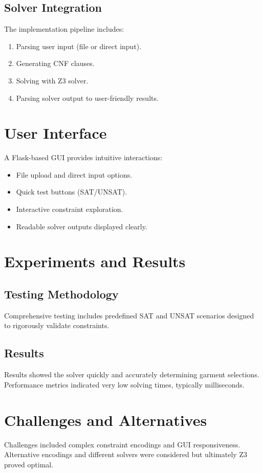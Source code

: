 \documentclass[unicode,11pt,a4paper,oneside,numbers=endperiod,openany]{scrartcl}
\begin{document}
\subsection{Solver Integration}
The implementation pipeline includes:
\begin{enumerate}
    \item Parsing user input (file or direct input).
    \item Generating CNF clauses.
    \item Solving with Z3 solver.
    \item Parsing solver output to user-friendly results.
\end{enumerate}

\section{User Interface}
A Flask-based GUI provides intuitive interactions:
\begin{itemize}
    \item File upload and direct input options.
    \item Quick test buttons (SAT/UNSAT).
    \item Interactive constraint exploration.
    \item Readable solver outputs displayed clearly.
\end{itemize}

\section{Experiments and Results}
\subsection{Testing Methodology}
Comprehensive testing includes predefined SAT and UNSAT scenarios designed to rigorously validate constraints.

\subsection{Results}
Results showed the solver quickly and accurately determining garment selections. Performance metrics indicated very low solving times, typically milliseconds.

\section{Challenges and Alternatives}
Challenges included complex constraint encodings and GUI responsiveness. Alternative encodings and different solvers were considered but ultimately Z3 proved optimal.
\end{document}

